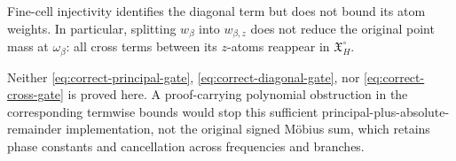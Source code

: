\begin{remark}
Fine-cell injectivity identifies the diagonal term but does not
bound its atom weights.  In particular, splitting \(w_\beta\) into
\(w_{\beta,z}\) does not reduce the original point mass at
\(\omega_\beta\): all cross terms between its \(z\)-atoms reappear
in \(\mathfrak X_H^\circ\).
\end{remark}

\begin{remark}
Neither \eqref{eq:correct-principal-gate},
\eqref{eq:correct-diagonal-gate}, nor
\eqref{eq:correct-cross-gate} is proved here.  A proof-carrying
polynomial obstruction in the corresponding termwise bounds would
stop this sufficient principal-plus-absolute-remainder
implementation, not the original signed M\"obius sum, which retains
phase constants and cancellation across frequencies and branches.
\end{remark}
